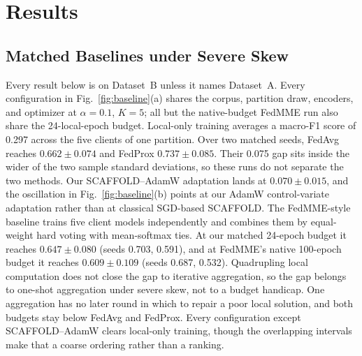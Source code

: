 \section{Results}
\label{sec:results}

\subsection{Matched Baselines under Severe Skew}

Every result below is on Dataset~B unless it names Dataset~A.
Every configuration in Fig.~\ref{fig:baseline}(a) shares the corpus, partition draw,
encoders,
and optimizer at $\alpha{=}0.1$, $K{=}5$; all but the native-budget FedMME run also
share the 24-local-epoch budget. Local-only training averages a macro-F1 score of
0.297 across the five clients of one partition. Over
two matched seeds, FedAvg reaches $0.662\!\pm\!0.074$ and FedProx
$0.737\!\pm\!0.085$. Their 0.075 gap sits inside the wider of the two sample
standard deviations, so these runs do not separate the two methods. Our
SCAFFOLD--AdamW adaptation lands at $0.070\!\pm\!0.015$, and the
oscillation in Fig.~\ref{fig:baseline}(b) points at our AdamW control-variate adaptation rather than
at classical SGD-based SCAFFOLD. The FedMME-style baseline trains five client models
independently and combines them by equal-weight hard voting with mean-softmax ties. At our matched 24-epoch budget it reaches
$0.647\!\pm\!0.080$ (seeds 0.703, 0.591), and at FedMME's native 100-epoch budget
it reaches $0.609\!\pm\!0.109$ (seeds 0.687, 0.532). Quadrupling local computation
does not close the gap to iterative aggregation, so the gap belongs to one-shot
aggregation under severe skew, not to a budget handicap. One aggregation has no later round in which to repair a
poor local solution, and both budgets stay below FedAvg and FedProx. Every configuration except
SCAFFOLD--AdamW clears
local-only training, though the overlapping intervals make that a coarse ordering
rather than a ranking.

